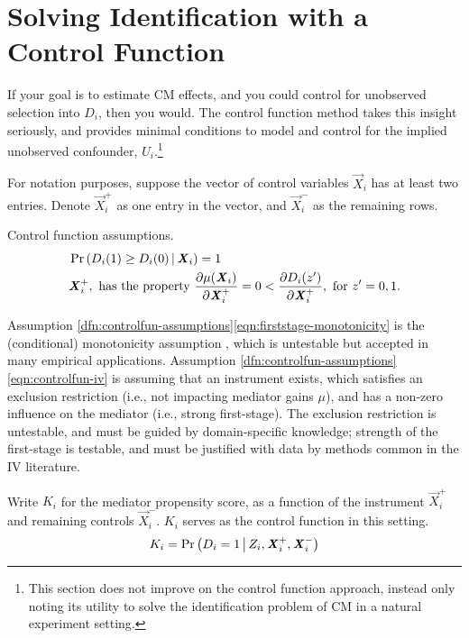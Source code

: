 \section{Solving Identification with a Control Function}
\label{sec:controlfun}
If your goal is to estimate CM effects, and you could control for unobserved selection into $D_i$, then you would.
The control function method takes this insight seriously, and provides minimal conditions to model and control for the implied unobserved confounder, $U_i$.\footnote{
    This section does not improve on the control function approach, instead only noting its utility to solve the identification problem of CM in a natural experiment setting.
}

For notation purposes, suppose the vector of control variables $\vec X_i$ has at least two entries.
Denote $\vec X_i^+$ as one entry in the vector, and $\vec X_i^-$ as the remaining rows.

\begin{definition}
    \label{dfn:controlfun-assumptions}
    Control function assumptions.
    \begin{align}
        \label{eqn:firststage-monotonicity}
        &\Probgiven{ D_i(1) \geq D_i(0) }{\vec X_i} = 1    \\
        \label{eqn:controlfun-iv}
        &\vec X_i^+, \text{ has the property }
        \partialdiff[\mu(\vec X_i)]{\vec X_i^+} = 0 < \partialdiff[D_i(z')]{\vec X_i^+}, \textnormal{ for } z' = 0, 1.
    \end{align}
\end{definition}
Assumption \ref{dfn:controlfun-assumptions}\eqref{eqn:firststage-monotonicity} is the (conditional) monotonicity assumption \citep{imbens1994identification}, which is untestable but accepted in many empirical applications.
Assumption \ref{dfn:controlfun-assumptions}\eqref{eqn:controlfun-iv} is assuming that an instrument exists, which satisfies an exclusion restriction (i.e., not impacting mediator gains $\mu$), and has a non-zero influence on the mediator (i.e., strong first-stage).
The exclusion restriction is untestable, and must be guided by domain-specific knowledge; strength of the first-stage is testable, and must be justified with data by methods common in the IV literature.

Write $K_i$ for the mediator propensity score, as a function of the instrument $\vec X_i^+$ and remaining controls $\vec X_i^-$.
$K_i$ serves as the control function in this setting.
\[ K_i = \Pr\left( D_i = 1 \, \middle\vert \, Z_i, \boldsymbol{\mathit{X}}_i^+, \boldsymbol{\mathit{X}}_i^- \right) \]

